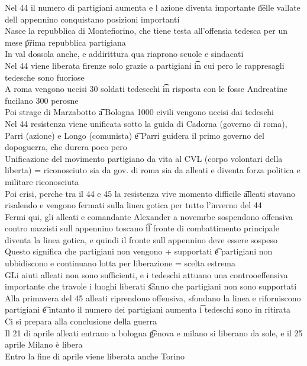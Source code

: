 \documentclass[12pt]{article}
\begin{document}
Nel 44 il numero di partigiani aumenta e l azione diventa importante \t nelle vallate dell appennino conquistano posizioni importanti \\
Nasce la repubblica di Montefiorino, che tiene testa all'offensia tedesca per un mese \t prima repubblica partigiana \\
In val dossola anche, e addirittura qua riaprono scuole e sindacati \\
Nel 44 viene liberata firenze solo grazie a partigiani \t in cui pero le rappresagli tedesche sono fuoriose \\
A roma vengono uccisi 30 soldati tedescchi \t in risposta con le fosse Andreatine fucilano 300 perosne \\
Poi strage di Marzabotto \t a Bologna 1000 civili vengono uccisi dai tedeschi \\
Nel 44 resistenza viene unificata sotto la guida di Cadorna (governo di roma), Parri (azione) e Longo (comunista) \t e Parri guidera il primo governo del dopoguerra, che durera poco pero \\
Unificazione del movimento partigiano da vita al CVL (corpo volontari della liberta) = riconosciuto sia da gov. di roma sia da alleati e diventa forza politica e militare riconosciuta \\
Poi crisi, perche tra il 44 e 45 la resistenza vive momento difficile \t alleati stavano risalendo e vengono fermati sulla linea gotica per tutto l'inverno del 44 \\
Fermi qui, gli alleati e comandante Alexander a novemrbe sospendono offensiva contro nazzisti sull appennino toscano \t il fronte di combattimento principale diventa la linea gotica, e quindi il fronte sull appennino deve essere sospeso \\
Questo significa che partigiani non vengono + supportati \t e partigiani non ubbidiscono e continuano lotta per liberazione = scelta estrema \\
GLi aiuti alleati non sono sufficienti, e i tedeschi attuano una controoeffensiva importante che travole i luoghi liberati \t sanno che partigiani non sono supportati \\
Alla primavera del 45 alleati riprendono offensiva, sfondano la linea e riforniscono partigiani \t e intanto il numero dei partigiani aumenta \t i tedeschi sono in ritirata \\
Ci si prepara alla conclusione della guerra \\
Il 21 di aprile alleati entrano a bologna \t genova e milano si liberano da sole, e il 25 aprile Milano è libera \\
Entro la fine di aprile viene liberata anche Torino
\end{document}
